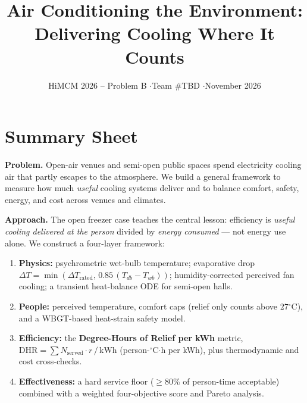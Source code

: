 \documentclass[11pt]{article}
\title{\textbf{Air Conditioning the Environment:\\ Delivering Cooling Where It Counts}}
\author{HiMCM 2026 -- Problem B \quad$\cdot$\quad Team \#TBD \quad$\cdot$\quad November 2026}
\date{}
\newcommand{\degrees}{\ensuremath{^\circ}}
\newcommand{\DHR}{\text{DHR}}
\begin{document}
\maketitle
\vspace{-4em}

\section*{Summary Sheet}
\textbf{Problem.} Open-air venues and semi-open public spaces spend electricity cooling air that partly escapes to the atmosphere. We build a general framework to measure how much \emph{useful} cooling systems deliver and to balance comfort, safety, energy, and cost across venues and climates.

\noindent\textbf{Approach.} The open freezer case teaches the central lesson: efficiency is \emph{useful cooling delivered at the person} divided by \emph{energy consumed} --- not energy use alone. We construct a four-layer framework:
\begin{enumerate}
\item \textbf{Physics:} psychrometric wet-bulb temperature; evaporative drop $\Delta T=\min(\Delta T_{\mathrm{rated}},\,0.85\,(T_{db}-T_{wb}))$; humidity-corrected perceived fan cooling; a transient heat-balance ODE for semi-open halls.
\item \textbf{People:} perceived temperature, comfort caps (relief only counts above $27\degrees$C), and a WBGT-based heat-strain safety model.
\item \textbf{Efficiency:} the \textbf{Degree-Hours of Relief per kWh} metric, $\DHR = \sum N_{\text{served}}\cdot r\,/\,\mathrm{kWh}$ (person-$\degrees$C$\cdot$h per kWh), plus thermodynamic and cost cross-checks.
\item \textbf{Effectiveness:} a hard service floor ($\geq$80\% of person-time acceptable) combined with a weighted four-objective score and Pareto analysis.
\end{enumerate}
\end{document}

